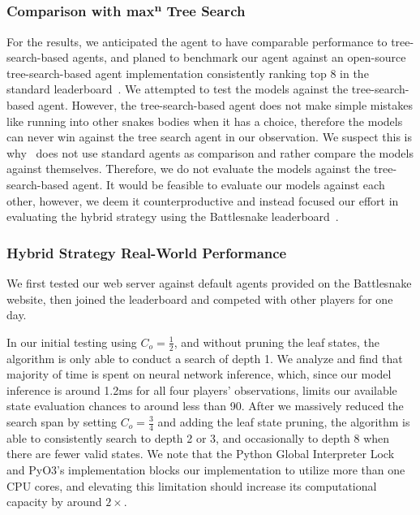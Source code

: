 \documentclass[conference]{IEEEtran}
\begin{document}
\subsubsection{Comparison with max\textsuperscript{n} Tree Search}

For the results,
we anticipated the agent to have comparable performance to tree-search-based
agents,
and planed to benchmark our agent against an open-source tree-search-based agent
implementation consistently ranking top 8 in the standard
leaderboard~\cite{wrenger2024rusty}.
We attempted to test the models against the tree-search-based agent. However,
the tree-search-based agent does not make simple mistakes like running into
other snakes bodies when it has a choice,
therefore the models can never win against the tree search agent in our
observation. We suspect this is why~\cite{chung2020battlesnake}
does not use standard agents as comparison and rather compare the models against
themselves. Therefore,
we do not evaluate the models against the tree-search-based agent.
It would be feasible to evaluate our models against each other, however,
we deem it counterproductive and instead focused our effort in evaluating the
hybrid strategy using the Battlesnake leaderboard~\cite{standard_leaderboard}.

\subsubsection{Hybrid Strategy Real-World Performance}

We first tested our web server against default agents provided on the
Battlesnake website,
then joined the leaderboard and competed with other players for one day.

In our initial testing using $C_o=\frac{1}{2}$,
and without pruning the leaf states,
the algorithm is only able to conduct a search of depth 1.
We analyze and find that majority of time is spent on neural network inference,
which,
since our model inference is around 1.2ms for all four players' observations,
limits our available state evaluation chances to around less than 90.
After we massively reduced the search span by setting $C_o=\frac{3}{4}$ and
adding the leaf state pruning,
the algorithm is able to consistently search to depth 2 or 3,
and occasionally to depth 8 when there are fewer valid states.
We note that the Python Global Interpreter Lock and PyO3's implementation blocks
our implementation to utilize more than one CPU cores,
and elevating this limitation should increase its computational capacity by
around $2\times$.
\end{document}
